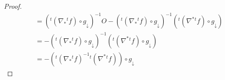 \documentclass[dvipdfmx]{jsarticle}
\begin{document}
\begin{proof}
\begin{align*}
&= \left({}^{t}\left( \nabla_{*}{}^{t}f \right) \circ g_{\downarrow} \right)^{- 1}O - \left({}^{t}\left( \nabla_{*}{}^{t}f \right) \circ g_{\downarrow} \right)^{- 1}\left({}^{t}\left( \nabla^{*}{}^{t}f \right) \circ g_{\downarrow} \right)\\
&= - \left({}^{t}\left( \nabla_{*}{}^{t}f \right) \circ g_{\downarrow} \right)^{- 1}\left({}^{t}\left( \nabla^{*}{}^{t}f \right) \circ g_{\downarrow} \right)\\
&= - \left({}^{t}\left( \nabla_{*}{}^{t}f \right)^{- 1}{}^{t}\left( \nabla^{*}{}^{t}f \right) \right) \circ g_{\downarrow}
\end{align*}
\begin{comment}
よって、次式が成り立つ。
\begin{align*}
J_{g}\left( \mathbf{x} \right) &= - \left({}^{t}\left( \nabla_{*}{}^{t}f \right)^{- 1}{}^{t}\left( \nabla^{*}{}^{t}f \right) \right) \circ g_{\downarrow}\left( \mathbf{x} \right)\\
&= -{}^{t}\left( \nabla_{*}{}^{t}f \right)^{- 1}{}^{t}\left( \nabla^{*}{}^{t}f \right)\begin{pmatrix}
\mathbf{x} \\
g\left( \mathbf{x} \right) \\
\end{pmatrix}\\
&= - \begin{pmatrix}
\partial_{m + 1}f_{1} & \partial_{m + 2}f_{1} & \cdots & \partial_{m + n}f_{1} \\
\partial_{m + 1}f_{2} & \partial_{m + 2}f_{2} & \cdots & \partial_{m + n}f_{2} \\
 \vdots & \vdots & \ddots & \vdots \\
\partial_{m + 1}f_{n} & \partial_{m + 2}f_{n} & \cdots & \partial_{m + n}f_{n} \\
\end{pmatrix}^{- 1}\begin{pmatrix}
\partial_{1}f_{1} & \partial_{2}f_{1} & \cdots & \partial_{m}f_{1} \\
\partial_{1}f_{2} & \partial_{2}f_{2} & \cdots & \partial_{m}f_{2} \\
 \vdots & \vdots & \ddots & \vdots \\
\partial_{1}f_{n} & \partial_{2}f_{n} & \cdots & \partial_{m}f_{n} \\
\end{pmatrix}\begin{pmatrix}
\mathbf{x} \\
g\left( \mathbf{x} \right) \\

\end{comment}
\end{proof}
\end{document}
